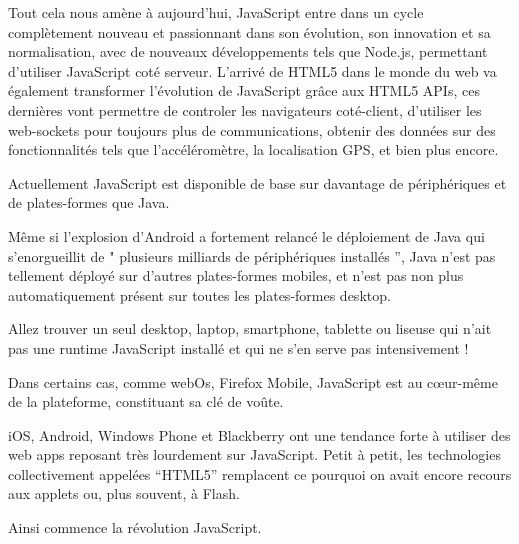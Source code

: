 Tout cela nous amène à aujourd’hui, JavaScript entre dans un cycle complètement nouveau et passionnant dans son évolution, son innovation et sa normalisation, avec de nouveaux développements tels que Node.js, permettant d’utiliser JavaScript coté serveur. L’arrivé de HTML5 dans le monde du web va également transformer l’évolution de JavaScript grâce aux HTML5 APIs, ces dernières vont permettre de controler les navigateurs coté-client, d'utiliser les web-sockets pour toujours plus de communications, obtenir des données sur des fonctionnalités tels que l'accéléromètre, la localisation GPS, et bien plus encore.

Actuellement JavaScript est disponible de base sur davantage de périphériques et de plates-formes que Java.

Même si l'explosion d’Android a fortement relancé le déploiement de Java qui s'enorgueillit de " plusieurs milliards de périphériques installés ”, Java n’est pas tellement déployé sur d’autres plates-formes mobiles, et n’est pas non plus automatiquement présent sur toutes les plates-formes desktop.

Allez trouver un seul desktop, laptop, smartphone, tablette ou liseuse qui n’ait pas une runtime JavaScript installé et qui ne s’en serve pas intensivement !

Dans certains cas, comme webOs, Firefox Mobile, JavaScript est au cœur-même de la plateforme, constituant sa clé de voûte.

iOS, Android, Windows Phone et Blackberry ont une tendance forte à utiliser des web apps reposant très lourdement sur JavaScript. Petit à petit, les technologies collectivement appelées “HTML5” remplacent ce pourquoi on avait encore recours aux applets ou, plus souvent, à Flash.

Ainsi commence la révolution JavaScript.